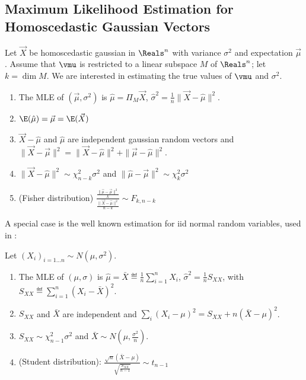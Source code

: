 \subsection{Maximum Likelihood Estimation for Homoscedastic Gaussian Vectors}
\begin{theorem}[ANOVA]
Let $\vec{X}$ be homoscedastic gaussian in $\Reals^n$ with
variance $\sigma^2$ and expectation $\vec{\mu}$. Assume that
$\vmu$ is restricted to a linear subspace $M$ of $\Reals^n$;
let $k=\dim M$. We are interested in estimating the true values
of $\vmu$ and $\sigma^2$.
\begin{enumerate}
  \item The MLE of $(\vec{\mu},\sigma^2)$ is
      $\hat{\mu}=\Pi_M \vec{X}$, $
  \hat{\sigma}^2=\frac{1}{n}\|\vec{X}-\hat{\mu}\|^2$.
  \item $\E(\hat{\mu})=\vec{\mu}=\E(\vec{X})$
  \item $\vec{X}-\hat{\mu}$ and $\hat{\mu}$ are independent
      gaussian random vectors and
  $\|\vec{X}-\vec{\mu}\|^2=\|\vec{X}-\hat{\mu}\|^2+\|\vec{\mu}-\hat{\mu}\|^2
  $.
  \item $\|\vec{X}-\hat{\mu}\|^2\sim \chi^2_{n-k} \sigma^2$ and
  $\|\hat{\mu}-\vec{\mu}\|^2\sim \chi^2_{k}\sigma^2$
  \item (Fisher distribution) $
  \frac{\frac{\|\hat{\mu}-\vec{\mu}\|^2}{k}}{\frac{\|\vec{X}-\hat{\mu}\|^2}{n-k}}\sim
  F_{k,n-k}
  $
  \end{enumerate}\label{mle-theo-de-base}
\end{theorem}
A special case is the well known estimation for iid normal
random variables, used in :
\begin{corollary}
Let $(X_i)_{i=1\ldots n}\sim
N(\mu,\sigma^2)$.
\begin{enumerate}
  \item The MLE of $(\mu,\sigma)$ is
      $\hat{\mu}=\bar{X}\eqdef \frac{1}{n}\sum_{i=1}^n
      X_i$, $ \hat{\sigma}^2=\frac{1}{n}S_{XX}$, with
      $S_{XX}\eqdef\sum_{i=1}^n (X_i-\bar{X})^2$.
  \item $S_{XX}$ and $\bar{X}$ are independent and $ \sum_i
      (X_i-\mu)^2=S_{XX}+ n(\bar{X}-\mu)^2$.
  \item $S_{XX} \sim \chi^2_{n-1} \sigma^2$ and $\bar{X}
      \sim N(\mu, \frac{\sigma^2}{n})$.
  \item (Student distribution):
      $\frac{\sqrt{n}(\bar{X}-\mu)}{\sqrt{\frac{
       S_{XX}}{n-1}}}\sim t_{n-1}$
    \end{enumerate}
    \label{coro-mle-student}
\end{corollary}

